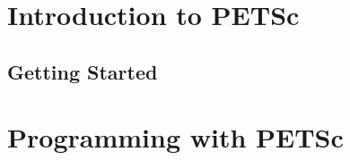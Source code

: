 \cleardoublepage
\pagestyle{fancy}
\vspace{1in}
\date{\today}



\cleardoublepage



\medskip \medskip

\cleardoublepage




\cleardoublepage
\label{tableofcontents}
\tableofcontents

\cleardoublepage
\part{Introduction to PETSc}
\label{part_intro}
\cleardoublepage
\chapter{Getting Started}


\cleardoublepage
\part{Programming with PETSc}
\label{part_usage}





\cleardoublepage

\addtocounter{chapter}{1}
\label{sec:bib}


